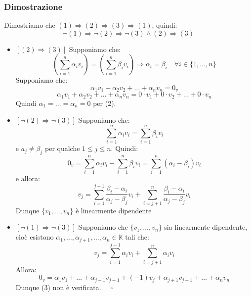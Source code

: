 \documentclass[a4paper]{article}
\theoremstyle{break}
\theoremstyle{break}
\theoremstyle{break}
\theoremstyle{break}
\begin{document}
\subsubsection{Dimostrazione}
Dimostriamo che \( (1) \Rightarrow (2) \Rightarrow (3) \Rightarrow (1) \), quindi:
\[
\neg (1) \Rightarrow \neg (2) \Rightarrow \neg (3) \land (2) \Rightarrow (3)
\] 
\begin{itemize}
  \item \( [(2) \Rightarrow (3)] \) Supponiamo che:
    \[
    \left( \sum_{i=1}^n \alpha_i v_i \right) = \left( \sum_{i=1}^n \beta_i v_i \right) \Rightarrow
    \alpha_i = \beta_i \quad \forall i \in \{1, \ldots, n\}
    \] 
    Supponiamo che:
    \[
    \alpha_1 v_1 + \alpha_2 v_2 + \ldots + \alpha_n v_n = 0_v
    \] 
    \[
    \alpha_1 v_1 + \alpha_2 v_2 + \ldots + \alpha_n v_n = 0 \cdot v_1 + 0 \cdot v_2 + \ldots + 0 \cdot v_n
    \] 
    Quindi \( \alpha_1 = \ldots = \alpha_n = 0 \) per (2).

  \item \( [\neg (2) \Rightarrow \neg (3)] \) Supponiamo che:
    \[
    \sum_{i=1}^n \alpha_i v_i = \sum_{i=1}^n \beta_i v_i
    \] 
    e \( a_j \neq \beta_j \) per qualche \( 1 \le j \le n \). Quindi:
    \[
    0_v = \sum_{i=1}^n \alpha_i v_i - \sum_{i=1}^n \beta_i v_i = \sum_{i=1}^n (\alpha_i - \beta_i) v_i
    \] 
    e allora:
    \[ v_j = \sum_{i=1}^{j-1} \frac{\beta_i - \alpha_i}{\alpha_j - \beta_j}v_i + 
    \sum_{i=j+1}^n \frac{\beta_i - \alpha_i}{\alpha_j - \beta_j}v_i \]
    Dunque \( \{v_1, \ldots, v_n\}  \) è linearmente dipendente

  \item \( [\neg (1) \Rightarrow \neg (3)] \) Supponiamo che \( \{v_1, \ldots, v_n\}  \) 
    sia linearmente dipendente, cioè esistono \( \alpha_1, \ldots, \alpha_{j+1}, \ldots, \alpha_n \in \mathbb{K}\) 
    tali che:
    \[
    v_j = \sum_{i=1}^{j-1} \alpha_i v_i + \sum_{i=j+1}^n \alpha_i v_i
    \] 
    Allora:
    \[
      0_v = \alpha_1 v_1 + \ldots + \alpha_{j-1} v_{j-1} + (-1) v_j + \alpha_{j+1} v_{j+1} + \ldots + \alpha_n v_n
    \] 
    Dunque (3) non è verificata. \( \quad \square \)
\end{itemize}
\end{document}
